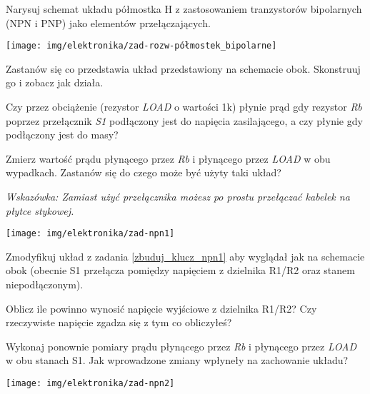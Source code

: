 \dbEntryCheckResults
Narysuj schemat układu półmostka H z zastosowaniem tranzystorów bipolarnych (NPN i PNP) jako elementów przełączających.
\fi
{}\dbEntryCheckResults
\begin{center}\texttt{[image: img/elektronika/zad-rozw-półmostek\_bipolarne]}\end{center}
\fi


%
%

\dbEntryCheckResults
\noindent\begin{minipage}[b]{0.6\textwidth}
Zastanów się co przedstawia układ przedstawiony na schemacie obok. Skonstruuj go i zobacz jak działa.

Czy przez obciążenie (rezystor \textit{LOAD} o wartości 1k) płynie prąd gdy rezystor \textit{Rb} poprzez przełącznik \textit{S1} podłączony jest do napięcia zasilającego, a czy płynie gdy podłączony jest do masy?

Zmierz wartość prądu płynącego przez \textit{Rb} i płynącego przez \textit{LOAD} w obu wypadkach. Zastanów się do czego może być użyty taki układ?

\textit{Wskazówka: Zamiast użyć przełącznika możesz po prostu przełączać kabelek na płytce stykowej.}
\end{minipage}
\hfill
\begin{minipage}[b]{0.35\textwidth}
\texttt{[image: img/elektronika/zad-npn1]}
\end{minipage}
\fi


\dbEntryCheckResults
\noindent\begin{minipage}[b]{0.5\textwidth}
Zmodyfikuj układ z zadania \ref{zbuduj_klucz_npn1} aby wyglądał jak na schemacie obok (obecnie S1 przełącza pomiędzy napięciem z dzielnika R1/R2 oraz stanem niepodłączonym).

Oblicz ile powinno wynosić napięcie wyjściowe z dzielnika R1/R2? Czy rzeczywiste napięcie zgadza się z tym co obliczyłeś?

Wykonaj ponownie pomiary prądu płynącego przez \textit{Rb} i płynącego przez \textit{LOAD} w obu stanach S1.
Jak wprowadzone zmiany wpłyneły na zachowanie układu?
\end{minipage}
\hfill
\begin{minipage}[b]{0.45\textwidth}
\texttt{[image: img/elektronika/zad-npn2]}
\end{minipage}
\fi


